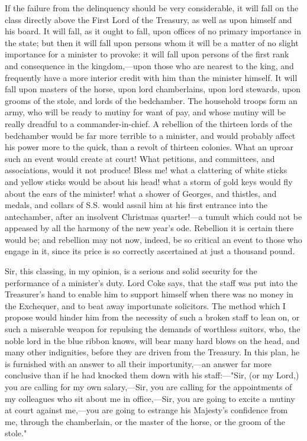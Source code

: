 If the failure from the delinquency should be very considerable, it will fall on the class directly above the First Lord of the Treasury, as well as upon himself and his board. It will fall, as it ought to fall, upon offices of no primary importance in the state; but then it will fall upon persons whom it will be a matter of no slight importance for a minister to provoke: it will fall upon persons of the first rank and consequence in the kingdom,—upon those who are nearest to the king, and frequently have a more interior credit with him than the minister himself. It will fall upon masters of the horse, upon lord chamberlains, upon lord stewards, upon grooms of the stole, and lords of the bedchamber. The household troops form an army, who will be ready to mutiny for want of pay, and whose mutiny will be really dreadful to a commander-in-chief. A rebellion of the thirteen lords of the bedchamber would be far more terrible to a minister, and would probably affect his power more to the quick, than a revolt of thirteen colonies. What an uproar such an event would create at court! What petitions, and committees, and associations, would it not produce! Bless me! what a clattering of white sticks and yellow sticks would be about his head! what a storm of gold keys would fly about the ears of the minister! what a shower of Georges, and thistles, and medals, and collars of S.S. would assail him at his first entrance into the antechamber, after an insolvent Christmas quarter!—a tumult which could not be appeased by all the harmony of the new year's ode. Rebellion it is certain there would be; and rebellion may not now, indeed, be so critical an event to those who engage in it, since its price is so correctly ascertained at just a thousand pound.

Sir, this classing, in my opinion, is a serious and solid security for the performance of a minister's duty. Lord Coke says, that the staff was put into the Treasurer's hand to enable him to support himself when there was no money in the Exchequer, and to beat away importunate solicitors. The method which I propose would hinder him from the necessity of such a broken staff to lean on, or such a miserable weapon for repulsing the demands of worthless suitors, who, the noble lord in the blue ribbon knows, will bear many hard blows on the head, and many other indignities, before they are driven from the Treasury. In this plan, he is furnished with an answer to all their importunity,—an answer far more conclusive than if he had knocked them down with his staff:—"Sir, (or my Lord,) you are calling for my own salary,—Sir, you are calling for the appointments of my colleagues who sit about me in office,—Sir, you are going to excite a mutiny at court against me,—you are going to estrange his Majesty's confidence from me, through the chamberlain, or the master of the horse, or the groom of the stole."

